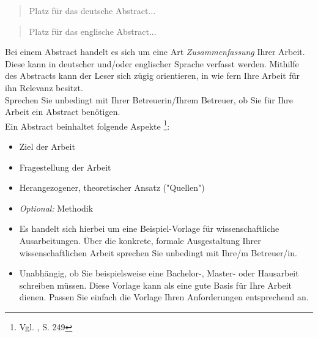 \documentclass[a4paper,12pt,oneside]{article}
\begin{document}
  \newpage
  \begin{abstract}
    Platz für das deutsche Abstract...
  \end{abstract}
  
  \renewcommand{\abstractname}{Abstract}
  \begin{abstract}
    Platz für das englische Abstract...
  \end{abstract}
    \vspace{1cm}
  \begin{tcolorbox}[title={Das Abstract}]
Bei einem Abstract handelt es sich um eine Art \textit{Zusammenfassung} Ihrer Arbeit. Diese kann in deutscher und/oder englischer Sprache verfasst werden. Mithilfe des Abstracts kann der Leser sich zügig orientieren, in wie fern Ihre Arbeit für ihn Relevanz besitzt.\\                                                                      Sprechen Sie unbedingt mit Ihrer Betreuerin/Ihrem Betreuer, ob Sie für Ihre Arbeit ein Abstract benötigen.\\
Ein Abstract beinhaltet folgende Aspekte \footnote{ Vgl. \cite{SW11}, S. 249}:
\begin{itemize}
 \item Ziel der Arbeit
 \item Fragestellung der Arbeit
  \item Herangezogener, theoretischer Ansatz ("Quellen")
  \item \textit{Optional:} Methodik
\end{itemize}
  \end{tcolorbox}

  \vspace{1cm}
  \begin{tcolorbox}[title={Hinweise zu dieser Dokumentvorlage}]
  \begin{itemize}
   \item Es handelt sich hierbei um eine Beispiel-Vorlage für wissenschaftliche Ausarbeitungen.
Über die konkrete, formale Ausgestaltung Ihrer wissenschaftlichen Arbeit sprechen Sie unbedingt mit Ihre/m Betreuer/in.
  \item Unabhängig, ob Sie beispielsweise eine Bachelor-, Master- oder Hausarbeit schreiben müssen. Diese Vorlage kann als eine gute Basis für Ihre Arbeit dienen. Passen Sie einfach die Vorlage Ihren Anforderungen entsprechend an.
  \end{itemize}
  \end{tcolorbox}
  
\end{document}
